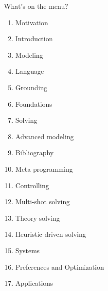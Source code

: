 \begin{frame}{What's on the menu?}
  \bigskip
  \begin{minipage}[t]{0.4\linewidth}
    \begin{enumerate}
    \item Motivation
    \item Introduction
    \item Modeling
    \item Language
    \item Grounding
    \item Foundations
    \item Solving
    \item Advanced modeling
      \medskip
    \item [] Bibliography
    \end{enumerate}
  \end{minipage}
  \begin{minipage}[t]{0.5\linewidth}
    \begin{enumerate}\setcounter{enumi}{9}
    \item Meta programming
    \item Controlling
    \item Multi-shot solving
    \item Theory solving
    \item Heuristic-driven solving
    \item Systems
    \item Preferences and Optimization
    \item Applications
    \end{enumerate}
  \end{minipage}
\end{frame}
%
